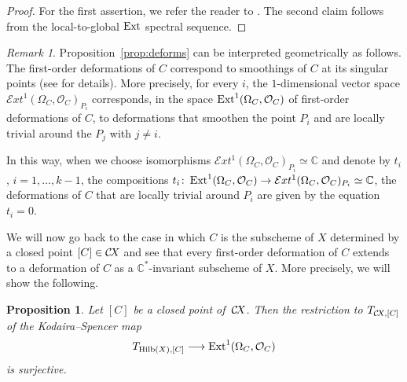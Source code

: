 \documentclass[10pt,a4paper]{article}
\numberwithin{equation}{section}
\newtheorem{proposition}[theorem]{Proposition}
\theoremstyle{definition}
\theoremstyle{remark}
\newtheorem{remark}[theorem]{Remark}
\def\C{{\mathbb C}}
\def\cO{{\mathcal{O}}}
\def\cExt{{\mathcal E}xt}
\def\operatorname#1{\mathop{\rm #1}\nolimits}
\def\Ext{\operatorname{Ext}}
\def\Hilb{\operatorname{Hilb}}
\def\CX{\mathcal{C}\!X\hspace{-0.5pt}}
\newcommand\lra{\longrightarrow}
\begin{document}
\begin{proof}
For the first assertion, we refer the reader to \cite[Remark~6.4.2]{Talpo}. The second claim follows from the local-to-global
$\Ext$ spectral sequence.
\end{proof}

\begin{remark}\label{rem:deforms}
  Proposition~\ref{prop:deforms} can be interpreted geometrically as follows. The first-order deformations of $C$ correspond to smoothings of $C$ at its singular points (see \cite[Sections~6.3 and~6.4]{Talpo} for details).  More precisely, for every $i$, the $1$-dimensional vector space $\cExt^1(\Omega_C,\cO_C)_{P_i}$ corresponds, in the space $\Ext^1(\Omega_C,\cO_C)$ of first-order deformations of $C$, to deformations that smoothen the point $P_i$ and are locally trivial around the $P_j$ with $j\neq i$.

In this way, when we choose isomorphisms $\cExt^1(\Omega_C,\cO_C)_{P_i}\simeq \C$ and denote by $t_i$, $i=1,\dots , k-1$, the compositions
$t_i\colon\Ext^1(\Omega_C,\cO_C)\to \cExt^1(\Omega_C,\cO_C)_{P_i}\simeq \C$,  the deformations of $C$ that are locally trivial around $P_i$ are given by the equation $t_i=0$.
\end{remark}

We will now go back to the case in which $C$ is the subscheme of $X$ determined by a closed point $[C]\in \CX$ and see that every first-order deformation of  $C$ extends to a deformation of $C$ as a $\C^*$-invariant subscheme of $X$. More precisely, we will show the following. 

\begin{proposition}\label{prop:kodspen}
Let $[C]$ be a closed point of\, $\CX$. Then  the restriction to $T_{\CX,[C]}$ of the Kodaira--Spencer map 
\[
T_{\Hilb(X),[C]}\lra \Ext^1(\Omega_C,\cO_C)
\]
is surjective.
\end{proposition}
\end{document}
